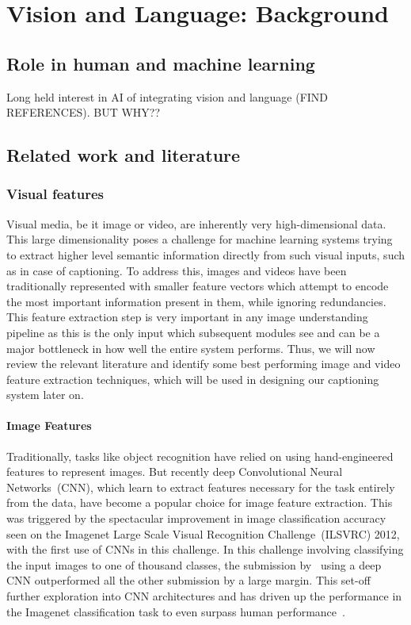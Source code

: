 \chapter{Vision and Language: Background} \label{chapter:background} 
\section{Role in human and machine learning}
Long held interest in AI of integrating vision and language (FIND REFERENCES). BUT WHY?? 
\section{Related work and literature}
\subsection{Visual features}
Visual media, be it image or video, are inherently very high-dimensional data.
This large dimensionality poses a challenge for machine learning systems trying
to extract higher level semantic information directly from such visual inputs, such as in
case of captioning.
To address this, images and videos have been traditionally represented with
smaller feature vectors which attempt to encode the most important information
present in them, while ignoring redundancies. 
This feature extraction step is very important in any image understanding
pipeline as this is the only input which subsequent modules see and can be a
major bottleneck in how well the entire system performs. 
Thus, we will now review the relevant literature and identify some best
performing image and video feature extraction techniques, which will be used in
designing our captioning system later on.

\subsubsection{Image Features}
Traditionally, tasks like object recognition have relied on using
hand-engineered features to represent images. 
But recently deep Convolutional Neural Networks~(CNN), which learn to extract features
necessary for the task entirely from the data, have become a popular choice for
image feature extraction.
This was triggered by the spectacular improvement in image classification
accuracy seen on the Imagenet Large Scale Visual Recognition Challenge~(ILSVRC)
2012, with the first use of CNNs in this challenge.
In this challenge involving classifying the input images to one of thousand
classes, the submission by~\cite{Krizhevsky2012} using a deep CNN outperformed
all the other submission by a large margin.
This set-off further exploration into CNN architectures and has driven up the
performance in the Imagenet classification task to even surpass human
performance~\cite{he2015delving}.

